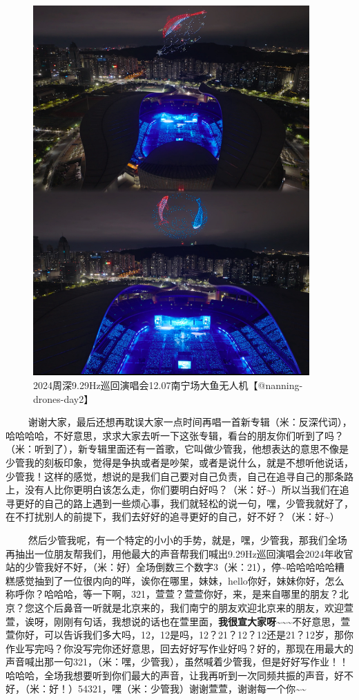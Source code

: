 \documentclass[]{ctexbook}
\begin{document}
\begin{figure}

{\centering \includegraphics[width=300pt]{img/nanning20241207/003} 

}

\caption{2024周深9.29Hz巡回演唱会12.07南宁场大鱼无人机【@nanning-drones-day2】}\label{fig:unnamed-chunk-141}
\end{figure}

   谢谢大家，最后还想再耽误大家一点时间再唱一首新专辑（米：反深代词），哈哈哈哈，不好意思，求求大家去听一下这张专辑，看台的朋友你们听到了吗？（米：听到了），新专辑里面还有一首歌，它叫做少管我，他想表达的意思不像是少管我的刻板印象，觉得是争执或者是吵架，或者是说什么，就是不想听他说话，少管我！这样的感觉，想说的是我们自己要对自己负责，自己在追寻自己的那条路上，没有人比你更明白该怎么走，你们要明白好吗？（米：好\textasciitilde）所以当我们在追寻更好的自己的路上遇到一些烦心事，我们就轻松的说一句，嘿，少管我就好了，在不打扰别人的前提下，我们去好好的追寻更好的自己，好不好？（米：好\textasciitilde）

   然后少管我呢，有一个特定的小小的手势，就是，嘿，少管我，那我们全场再抽出一位朋友帮我们，用他最大的声音帮我们喊出9.29Hz巡回演唱会2024年收官站的少管我好不好，（米：好）全场倒数三个数字3（米：21），停\textasciitilde 哈哈哈哈哈糟糕感觉抽到了一位很内向的咩，诶你在哪里，妹妹，hello你好，妹妹你好，怎么称呼你？哈哈哈，等一下啊，321，萱萱？萱萱你好，来，是来自哪里的朋友？北京？您这个后鼻音一听就是北京来的，我们南宁的朋友欢迎北京来的朋友，欢迎萱萱，诶呀，刚刚有句话，我想说的话也在萱里面，\textbf{我很宣大家呀\textasciitilde\textasciitilde\textasciitilde{}}不好意思，萱萱你好，可以告诉我们多大吗，12，12是吗，12？21？12？12还是21？12岁，那你作业写完吗？你没写完你还好意思，回去好好写作业好吗？好的，那现在用最大的声音喊出那一句321，（米：嘿，少管我），虽然喊着少管我，但是好好写作业！！哈哈哈，全场我想要听到你们最大的声音，让我再听到一次同频共振的声音，好不好，（米：好！）54321，嘿（米：少管我）谢谢萱萱，谢谢每一个你\textasciitilde\textasciitilde{}
\end{document}

